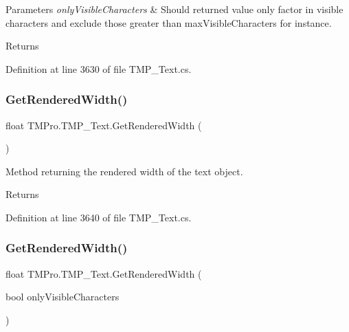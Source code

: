 \begin{DoxyParams}{Parameters}
{\em only\+Visible\+Characters} & Should returned value only factor in visible characters and exclude those greater than max\+Visible\+Characters for instance.\\
\hline
\end{DoxyParams}
\begin{DoxyReturn}{Returns}

\end{DoxyReturn}


Definition at line 3630 of file T\+M\+P\+\_\+\+Text.\+cs.

\mbox{\label{class_t_m_pro_1_1_t_m_p___text_a1c36b279765c95e9530d1e3ce2511d8d}} 
\subsubsection{\texorpdfstring{GetRenderedWidth()}{GetRenderedWidth()}\hspace{0.1cm}{\footnotesize\ttfamily [1/2]}}
{\footnotesize\ttfamily float T\+M\+Pro.\+T\+M\+P\+\_\+\+Text.\+Get\+Rendered\+Width (\begin{DoxyParamCaption}{ }\end{DoxyParamCaption})\hspace{0.3cm}{\ttfamily [protected]}}



Method returning the rendered width of the text object. 

\begin{DoxyReturn}{Returns}

\end{DoxyReturn}


Definition at line 3640 of file T\+M\+P\+\_\+\+Text.\+cs.

\mbox{\label{class_t_m_pro_1_1_t_m_p___text_aab9263cb25a2af2ef736c9e2d0f63e40}} 
\subsubsection{\texorpdfstring{GetRenderedWidth()}{GetRenderedWidth()}\hspace{0.1cm}{\footnotesize\ttfamily [2/2]}}
{\footnotesize\ttfamily float T\+M\+Pro.\+T\+M\+P\+\_\+\+Text.\+Get\+Rendered\+Width (\begin{DoxyParamCaption}\item[{bool}]{only\+Visible\+Characters }\end{DoxyParamCaption})\hspace{0.3cm}{\ttfamily [protected]}}



